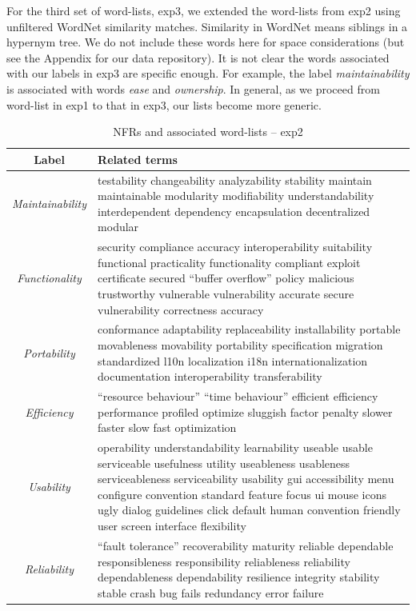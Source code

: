 \documentclass[]{sig-alternate}
\begin{document}
For the third set of word-lists, \textsf{exp3}, we extended the word-lists from \textsf{exp2} using unfiltered WordNet similarity matches. 
Similarity in WordNet means siblings in a hypernym tree. 
We do not include these words here for space considerations (but see the Appendix for our data repository). 
It is not clear the words associated with our labels in \textsf{exp3} are specific enough. For example, the label \emph{maintainability} is associated with words \emph{ease} and \emph{ownership}. In general, as we proceed from word-list in \textsf{exp1} to that in \textsf{exp3}, our lists become more generic.

\begin{table}
	\centering
\begin{tabular}{c|p{11cm}}
\toprule
\textbf{Label} & \textbf{Related terms} \\
\midrule
\emph{Maintainability} &
testability changeability analyzability stability maintain maintainable modularity modifiability understandability interdependent dependency encapsulation decentralized modular\\ \hline
\emph{Functionality} &
security compliance accuracy interoperability suitability functional practicality functionality compliant exploit certificate secured ``buffer overflow'' policy malicious trustworthy vulnerable vulnerability accurate secure vulnerability correctness accuracy\\ \hline
\emph{Portability} &
conformance adaptability replaceability installability portable movableness movability portability specification migration standardized l10n localization i18n internationalization documentation interoperability transferability\\ \hline
\emph{Efficiency} &
``resource behaviour'' ``time behaviour'' efficient efficiency performance profiled optimize sluggish factor penalty slower faster slow fast optimization\\ \hline
\emph{Usability} &
operability understandability learnability useable usable serviceable usefulness utility useableness usableness serviceableness serviceability usability gui accessibility menu configure convention standard feature focus ui mouse icons ugly dialog guidelines click default human convention friendly user screen interface flexibility\\ \hline
\emph{Reliability} &
``fault tolerance'' recoverability maturity reliable dependable responsibleness responsibility reliableness reliability dependableness dependability resilience integrity stability stable crash bug fails redundancy error failure\\ 
\bottomrule
\end{tabular}
	\caption{NFRs and associated word-lists -- \textsf{exp2}}
	\label{tbl:wnsig}

\end{table}
\end{document}
